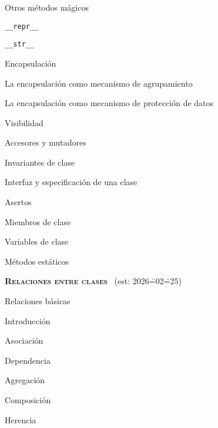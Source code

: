 \begin{longenum}
\begin{longenum}
\begin{longenum}
            \item Otros métodos mágicos
            \begin{longenum}
                \item \texttt{\_\_repr\_\_}
                \item \texttt{\_\_str\_\_}
            \end{longenum}
        \end{longenum}
        \item Encapsulación
        \begin{longenum}
            \item La encapsulación como mecanismo de agrupamiento
            \item La encapsulación como mecanismo de protección de datos
            \begin{longenum}
                \item Visibilidad
                \item Accesores y mutadores
                \item Invariantes de clase
                \item Interfaz y especificación de una clase
                \item Asertos
            \end{longenum}
        \end{longenum}
        \item Miembros de clase
        \begin{longenum}
            \item Variables de clase
            \item Métodos estáticos
        \end{longenum}
    \end{longenum}
    \item \textbf{\textsc{Relaciones entre clases}} \ (est: 2026\==02\==25)
    \begin{longenum}
        \item Relaciones básicas
        \begin{longenum}
            \item Introducción
            \item Asociación
            \item Dependencia
            \item Agregación
            \item Composición
        \end{longenum}
        \item Herencia

\end{longenum}
\end{longenum}
